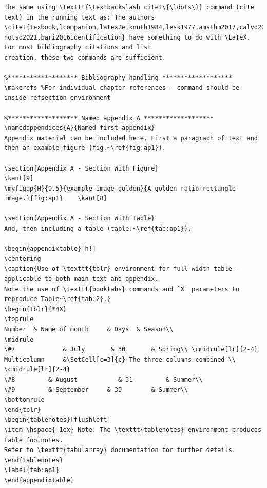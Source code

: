 \documentclass{article}
\begin{document}
{\begin{verbatim}
The same using \texttt{\textbackslash citet\{\ldots\}} command (cite text) in the running text as: The authors 
\citet{texbook,lcompanion,latex2e,knuth1984,lesk1977,amsthm2017,calvo2004using,cannayen2011latex,kopka2004guide,
notso2021,bari2016identification} have something to do with \LaTeX. For most bibliography citations and list 
creation, these two commands are sufficient.

%******************* Bibliography handling *******************
\makerefs %For individual chapter references - command should be inside refsection environment

%******************* Named appendix A *******************
\namedappendices{A}{Named first appendix}
Appendix material can be included here. First a paragraph of text and then an example figure (fig.~\ref{fig:ap1}).

\section{Appendix A - Section With Figure}
\kant[9]
\myfigap{H}{0.5}{example-image-golden}{A golden ratio rectangle image.}{fig:ap1}	\kant[8]

\section{Appendix A - Section With Table}
And, then including a table (table.~\ref{tab:ap1}).

\begin{appendixtable}[h!]
\centering
\caption{Use of \texttt{tblr} environment for full-width table - applicable to both main text and appendix.  
Note the use of \texttt{booktabs} commands and `X' parameters to reproduce Table~\ref{tab:2}.}
\begin{tblr}{*4X}
\toprule
Number 	& Name of month 	& Days 	& Season\\
\midrule
\#7 			& July       & 30 		& Spring\\ \cmidrule[lr]{2-4}
Multicolumn 	&\SetCell[c=3]{c} The three columns combined \\ \cmidrule[lr]{2-4}
\#8 		& August 		   & 31 		& Summer\\
\#9 		& September 	& 30 		& Summer\\
\bottomrule
\end{tblr}
\begin{tablenotes}[flushleft]
\item \hspace{-1ex} Note: The \texttt{tablenotes} environment produces table footnotes.  
Refer to \texttt{tabularray} documentation for further details.  
\end{tablenotes}
\label{tab:ap1}
\end{appendixtable}


\end{verbatim}}
\end{document}
